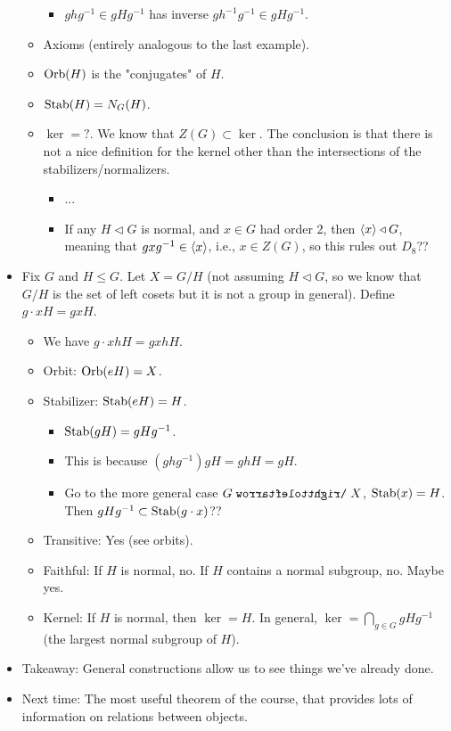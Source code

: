 \documentclass[../notes.tex]{subfiles}
\begin{document}
\begin{itemize}
\begin{itemize}
\begin{itemize}
            \item $ghg^{-1}\in gHg^{-1}$ has inverse $gh^{-1}g^{-1}\in gHg^{-1}$.
        \end{itemize}
        \item Axioms (entirely analogous to the last example).
        \item $\operatorname{Orb}(H)$ is the "conjugates" of $H$.
        \item $\operatorname{Stab}(H)=N_G(H)$.
        \item $\ker=?$. We know that $Z(G)\subset\ker$. The conclusion is that there is not a nice definition for the kernel other than the intersections of the stabilizers/normalizers.
        \begin{itemize}
            \item ...
            \item If any $H\triangleleft G$ is normal, and $x\in G$ had order 2, then $\left\langle{x}\right\rangle\triangleleft G$, meaning that $gxg^{-1}\in\left\langle{x}\right\rangle$, i.e., $x\in Z(G)$, so this rules out $D_8$??
        \end{itemize}
    \end{itemize}
    \item Fix $G$ and $H\leq G$. Let $X=G/H$ (not assuming $H\triangleleft G$, so we know that $G/H$ is the set of left cosets but it is not a group in general). Define $g\cdot xH=gxH$.
    \begin{itemize}
        \item We have $g\cdot xhH=gxhH$.
        \item Orbit: $\operatorname{Orb}(eH)=X$.
        \item Stabilizer: $\operatorname{Stab}(eH)=H$.
        \begin{itemize}
            \item $\operatorname{Stab}(gH)=gHg^{-1}$.
            \item This is because $(ghg^{-1})gH=ghH=gH$.
            \item Go to the more general case $G\acts X$, $\operatorname{Stab}(x)=H$. Then $gHg^{-1}\subset\operatorname{Stab}(g\cdot x)$??
        \end{itemize}
        \item Transitive: Yes (see orbits).
        \item Faithful: If $H$ is normal, no. If $H$ contains a normal subgroup, no. Maybe yes.
        \item Kernel: If $H$ is normal, then $\ker=H$. In general, $\ker=\bigcap_{g\in G}gHg^{-1}$ (the largest normal subgroup of $H$).
    \end{itemize}
    \item Takeaway: General constructions allow us to see things we've already done.
    \item Next time: The most useful theorem of the course, that provides lots of information on relations between objects.
\end{itemize}
\end{document}
